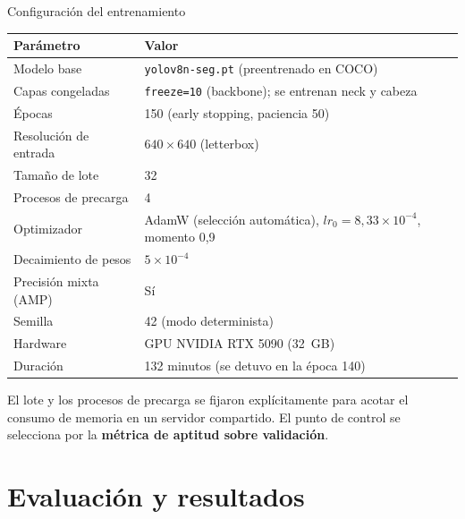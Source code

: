 \documentclass[aspectratio=169,11pt]{beamer}
\begin{document}
\begin{frame}{Configuración del entrenamiento}
  \centering
  \small
  \begin{tabular}{@{}ll@{}}
    \toprule
    \textbf{Parámetro} & \textbf{Valor} \\
    \midrule
    Modelo base & \texttt{yolov8n-seg.pt} (preentrenado en COCO) \\
    Capas congeladas & \texttt{freeze=10} (backbone); se entrenan neck y cabeza \\
    Épocas & 150 (early stopping, paciencia 50) \\
    Resolución de entrada & $640\times640$ (letterbox) \\
    Tamaño de lote & 32 \\
    Procesos de precarga & 4 \\
    Optimizador & AdamW (selección automática), $lr_0 = 8{,}33\times10^{-4}$, momento 0,9 \\
    Decaimiento de pesos & $5\times10^{-4}$ \\
    Precisión mixta (AMP) & Sí \\
    Semilla & 42 (modo determinista) \\
    Hardware & GPU NVIDIA RTX 5090 (32~GB) \\
    Duración & 132 minutos (se detuvo en la época 140) \\
    \bottomrule
  \end{tabular}

  \vspace{0.8em}
  {\footnotesize El lote y los procesos de precarga se fijaron explícitamente para acotar
  el consumo de memoria en un servidor compartido. El punto de control se selecciona por
  la \textbf{métrica de aptitud sobre validación}.}
\end{frame}

\section{Evaluación y resultados}
\end{document}
